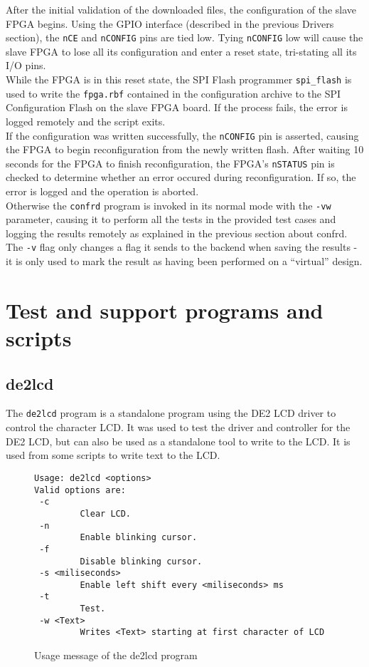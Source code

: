 After the initial validation of the downloaded files, the configuration of the slave FPGA
begins. Using the GPIO interface (described in the previous Drivers section), the \texttt{nCE}
and \texttt{nCONFIG} pins are tied low. Tying \texttt{nCONFIG} low will cause the slave FPGA
to lose all its configuration and enter a reset state, tri-stating all its I/O pins.
\\

While the FPGA is in this reset state, the SPI Flash programmer \texttt{spi\_flash} is used
to write the \texttt{fpga.rbf} contained in the configuration archive to the SPI Configuration
Flash on the slave FPGA board. If the process fails, the error is logged remotely and the
script exits.
\\

If the configuration was written successfully, the \texttt{nCONFIG} pin is asserted, causing
the FPGA to begin reconfiguration from the newly written flash. After waiting 10 seconds
for the FPGA to finish reconfiguration, the FPGA's \texttt{nSTATUS} pin is checked to determine
whether an error occured during reconfiguration. If so, the error is logged and the operation
is aborted.
\\

Otherwise the \texttt{confrd} program is invoked in its normal mode with the \texttt{-vw} parameter,
causing it to perform all the tests in the provided test cases and logging the results remotely
as explained in the previous section about confrd. The \texttt{-v} flag only changes a flag it sends
to the backend when saving the results - it is only used to mark the result as having been performed
on a ``virtual'' design.


\newpage
\section{Test and support programs and scripts}
\subsection{de2lcd}
The \texttt{de2lcd} program is a standalone program using the DE2 LCD driver to control
the character LCD. It was used to test the driver and controller for the DE2 LCD, but
can also be used as a standalone tool to write to the LCD. It is used from some scripts
to write text to the LCD.


\begin{figure}[h!]
\lstset{basicstyle=\scriptsize\ttfamily}
\begin{lstlisting}
Usage: de2lcd <options>
Valid options are:
 -c
         Clear LCD.
 -n
         Enable blinking cursor.
 -f
         Disable blinking cursor.
 -s <miliseconds>
         Enable left shift every <miliseconds> ms
 -t
         Test.
 -w <Text>
         Writes <Text> starting at first character of LCD
\end{lstlisting}
\caption{Usage message of the de2lcd program}
\end{figure}


